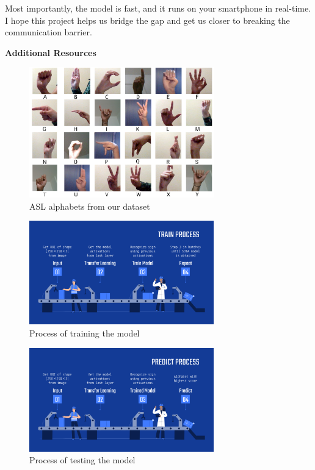 \documentclass[twocolumn]{article}
\begin{document}
Most importantly, the model is fast, and it runs on your smartphone in 
real-time. I hope this project helps us bridge the gap and get us closer to 
breaking the communication barrier.





\listoffigures
\listoftables

\glsaddall
\setlength{\glsdescwidth}{0.8\textwidth}
\printglossary[type=\acronymtype,title=List Of Abbreviations]

\clearpage
\LARGE{\textbf{Additional Resources}}

\begin{figure}[h]
\centering
\includegraphics[width=8cm]{./figures/alphabets}
\caption{ASL alphabets from our dataset}
\end{figure}

\begin{figure}[h]
\centering
\includegraphics[width=8cm]{./figures/train process}
\caption{Process of training the model}
\end{figure}

\begin{figure}[h]
\centering
\includegraphics[width=8cm]{./figures/predict process}
\caption{Process of testing the model}
\end{figure}
\end{document}
